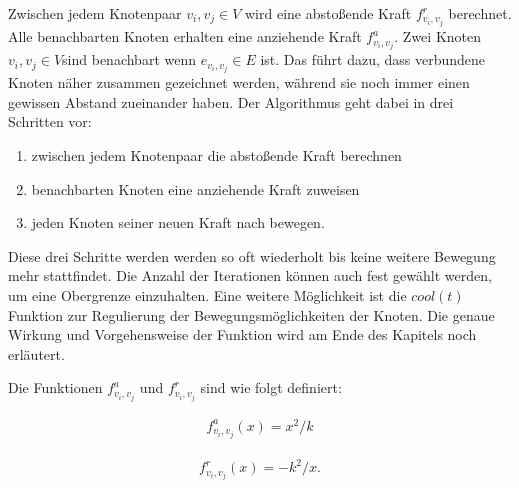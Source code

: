 Zwischen jedem Knotenpaar $v_{i},v_{j} \in V$ wird eine abstoßende Kraft \begin{math} f^{r}_{v_{i},v_{j}}  \end{math} berechnet.   Alle benachbarten Knoten erhalten eine anziehende Kraft \begin{math} f^{a}_{v_{i},v_{j}} \end{math}. Zwei Knoten \begin{math} v_{i},v_{j} \in V \end{math}sind benachbart wenn \begin{math} e_{v_{i},v_{j}} \in E \end{math} ist. Das führt dazu, dass verbundene Knoten näher zusammen gezeichnet werden, während sie noch immer einen gewissen Abstand zueinander haben. Der Algorithmus geht dabei in drei Schritten vor:

\begin{enumerate}
	\item zwischen jedem Knotenpaar die abstoßende Kraft berechnen
	\item benachbarten Knoten eine anziehende Kraft zuweisen
	\item jeden Knoten seiner neuen Kraft nach bewegen.
\end{enumerate} 
Diese drei Schritte werden werden so oft wiederholt bis keine weitere Bewegung mehr stattfindet. Die Anzahl der Iterationen können auch fest gewählt werden, um eine Obergrenze einzuhalten. Eine weitere Möglichkeit ist die $cool(t)$ Funktion zur Regulierung der Bewegungsmöglichkeiten der Knoten. Die genaue Wirkung und Vorgehensweise der Funktion wird am Ende des Kapitels noch erläutert.

Die Funktionen \begin{math} f^{a}_{v_{i},v_{j}} \end{math} und \begin{math} f^{r}_{v_{i},v_{j}} \end{math} sind wie folgt definiert:


\begin{align}
	f^{a}_{v_{i},v_{j}} (x) =
	x^{2}/k
\end{align}

\begin{align}
	f^{r}_{v_{i},v_{j}} (x) =
	-k^{2}/x.
\end{align}


